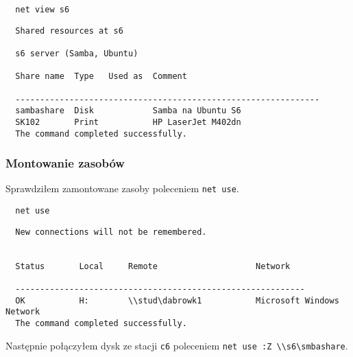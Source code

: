 \documentclass{article} %
\begin{document}
\begin{tcolorbox}[colback=yellow!10!white,colframe=red!45!black,coltitle=yellow!100!black, title=Windows]
  \begin{lstlisting}
  net view s6
  \end{lstlisting}
  \tcblower
  \footnotesize
  \begin{lstlisting}
  Shared resources at s6
  
  s6 server (Samba, Ubuntu)

  Share name  Type   Used as  Comment

  --------------------------------------------------------------
  sambashare  Disk            Samba na Ubuntu S6
  SK102       Print           HP LaserJet M402dn
  The command completed successfully.
  \end{lstlisting}
\end{tcolorbox}
\normalsize

\subsubsection{Montowanie zasobów}
Sprawdziłem zamontowane zasoby poleceniem \texttt{net use}.

\begin{tcolorbox}[colback=yellow!10!white,colframe=red!45!black,coltitle=yellow!100!black, title=Windows]
  \begin{lstlisting}
  net use
  \end{lstlisting}
  \tcblower
  \footnotesize
  \begin{lstlisting}
  New connections will not be remembered.


  Status       Local     Remote                    Network
  
  -----------------------------------------------------------
  OK           H:        \\stud\dabrowk1           Microsoft Windows Network
  The command completed successfully.
  \end{lstlisting}
\end{tcolorbox}
\normalsize
\vspace{5mm}

Następnie połączyłem dysk ze stacji \texttt{c6} poleceniem \texttt{net use :Z \textbackslash{}\textbackslash{}s6\textbackslash{}smbashare}.
\end{document}
